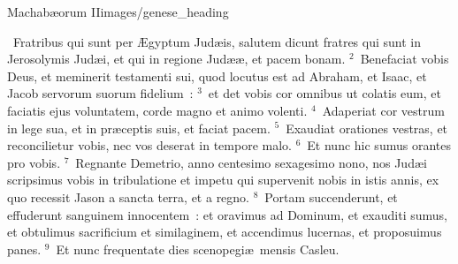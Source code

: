 {Machabæorum II}{images/genese_heading}

~\lettrine[lines=10,image=true,loversize=0.05,lraise=-0.03]{F}{}ratribus qui sunt per \AE gyptum Jud\ae is, salutem dicunt fratres qui sunt in Jerosolymis Jud\ae i, et qui in regione Jud\ae \ae , et pacem bonam.
${}^{2}$~Benefaciat vobis Deus, et meminerit testamenti sui, quod locutus est ad Abraham, et Isaac, et Jacob servorum suorum fidelium~:
${}^{3}$~et det vobis cor omnibus ut colatis eum, et faciatis ejus voluntatem, corde magno et animo volenti.
${}^{4}$~Adaperiat cor vestrum in lege sua, et in pr\ae ceptis suis, et faciat pacem.
${}^{5}$~Exaudiat orationes vestras, et reconcilietur vobis, nec vos deserat in tempore malo.
${}^{6}$~Et nunc hic sumus orantes pro vobis.
${}^{7}$~Regnante Demetrio, anno centesimo sexagesimo nono, nos Jud\ae i scripsimus vobis in tribulatione et impetu qui supervenit nobis in istis annis, ex quo recessit Jason a sancta terra, et a regno.
${}^{8}$~Portam succenderunt, et effuderunt sanguinem innocentem~: et oravimus ad Dominum, et exauditi sumus, et obtulimus sacrificium et similaginem, et accendimus lucernas, et proposuimus panes.
${}^{9}$~Et nunc frequentate dies scenopegi\ae\ mensis Casleu.


